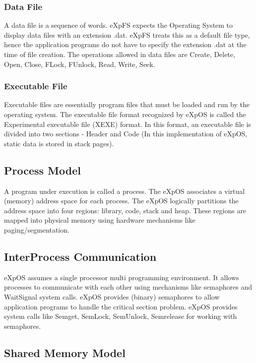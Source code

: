 \documentclass[11pt ,twosided]{article}
\begin{document}
\subsubsection{Data File}

A data file is a sequence of words. eXpFS expects the Operating System to display data files with an extension .dat.   eXpFS treats this as a default file type, hence the application programs do not have to specify the extension .dat at the time of file creation.  
The operations allowed in data files are Create, Delete, Open, Close, FLock, FUnlock, Read, Write, Seek.
\subsubsection{Executable File}

Executable files are essentially program files that must be loaded and run by the operating system. The executable file format recognized by eXpOS is called the Experimental executable file (XEXE) format. In this format, an executable file is divided into two sections - Header and Code (In this implementation of eXpOS, static data is stored in stack pages).
\subsection{Process Model}

A program under execution is called a process. The eXpOS associates a virtual (memory) address space for each process. The eXpOS logically partitions the address space into four regions: library, code, stack and heap. These regions are mapped into physical memory using hardware mechanisms like paging/segmentation.
\subsection{Inter\-Process Communication}

eXpOS assumes a single processor multi programming environment. It allows processes to communicate with each other using mechanisms like semaphores and Wait\-Signal system calls.
eXpOS provides (binary) semaphores to allow application programs to handle the critical section problem. eXpOS provides system calls like Semget, SemLock, SemUnlock, Semrelease for working with semaphores.
\subsection{Shared Memory Model}
\end{document}
